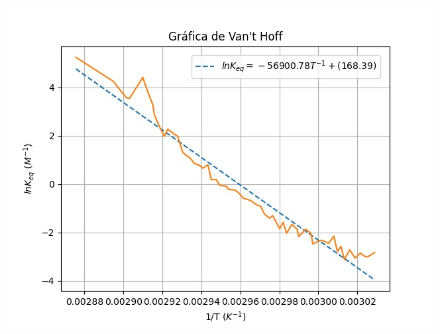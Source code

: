 \documentclass{article}
\begin{document}
\begin{figure}[h!]
\begin{minipage}[b]{0.45\textwidth}
          \includegraphics[scale=0.5]{g32.jpeg}
        \end{minipage}
    \end{figure}
\end{document}
